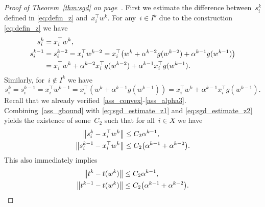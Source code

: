 \begin{proof}[Proof of Theorem~\ref{thm:sgd} on page~\pageref{thm:sgd}]
  First we estimate the difference between~$s_i^k$ defined in \eqref{eq:defin_z} and~$x_i^\top w^k$. For any~$i\in I^k$ due to the construction \eqref{eq:defin_z} we have
  \begin{equation}\label{eq:sgd_estimate_z1}
    \begin{aligned}
      s_i^k
      & = x_i^\top w^k, \\
      s_i^{k-1}
      & = s_i^{k-2} = x_i^\top w^{k-2}
        = x_i^\top \Brac{w^k + \alpha^{k-2}g(w^{k-2}) + \alpha^{k-1}g(w^{k-1})} \\
      & = x_i^\top w^k + \alpha^{k-2}x_i^\top g(w^{k-2}) + \alpha^{k-1}x_i^\top g(w^{k-1}).
    \end{aligned}
  \end{equation}
  Similarly, for~$i\notin I^k$ we have
  \begin{equation}\label{eq:sgd_estimate_z2}
    s_i^k
    = s_i^{k-1}
    = x_i^\top w^{k-1}
    = x_i^\top (w^k+\alpha^{k-1}g(w^{k-1}))
    = x_i^\top w^k + \alpha^{k-1}x_i^\top g(w^{k-1}).
  \end{equation}
  Recall that we already verified~\ref{ass_convex}-\ref{ass_alpha3}. Combining~\ref{ass_gbound} with \eqref{eq:sgd_estimate_z1} and \eqref{eq:sgd_estimate_z2} yields the existence of some~$C_2$ such that for all~$i\in X$ we have
  \begin{equation}\label{eq:estimate_diff_z}
    \begin{aligned}
      \nrm{s_i^k - x_i^\top w^k} &\le C_2\alpha^{k-1}, \\
      \nrm{s_i^{k-1} - x_i^\top w^k} &\le C_2\Brac{\alpha^{k-1}+\alpha^{k-2}}. \\
    \end{aligned}
  \end{equation}
  This also immediately implies
  \begin{equation}\label{eq:estimate_diff_t}
    \begin{aligned}
      \nrm{t^k - t(w^k)}     & \le C_2\alpha^{k-1}, \\
      \nrm{t^{k-1} - t(w^k)} & \le C_2\Brac{\alpha^{k-1}+\alpha^{k-2}}. \\
    \end{aligned}
  \end{equation}


\end{proof}

